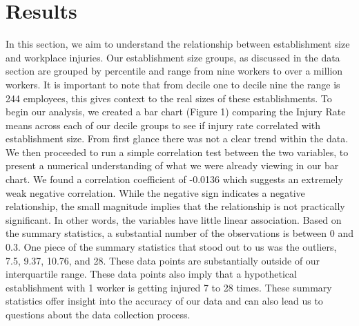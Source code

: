 \documentclass[12pt]{article}
\begin{document}
\section{Results}
\label{sec:result}
In this section, we aim to understand the relationship between establishment size and workplace injuries. Our establishment size groups, as discussed in the data section are grouped by percentile and range from nine workers to over a million workers. It is important to note that from decile one to decile nine the range is 244 employees, this gives context to the real sizes of these establishments. To begin our analysis, we created a bar chart (Figure 1) comparing the Injury Rate means across each of our decile groups to see if injury rate correlated with establishment size. From first glance there was not a clear trend within the data. We then proceeded to run a simple correlation test between the two variables, to present a numerical understanding of what we were already viewing in our bar chart. We found a correlation coefficient of -0.0136 which suggests an extremely weak negative correlation. While the negative sign indicates a negative relationship, the small magnitude implies that the relationship is not practically significant. In other words, the variables have little linear association. Based on the summary statistics, a substantial number of the observations is between 0 and 0.3. One piece of the summary statistics that stood out to us was the outliers, 7.5, 9.37, 10.76, and 28. These data points are substantially outside of our interquartile range. These data points also imply that a hypothetical establishment with 1 worker is getting injured 7 to 28 times. These summary statistics offer insight into the accuracy of our data and can also lead us to questions about the data collection process.
\end{document}
